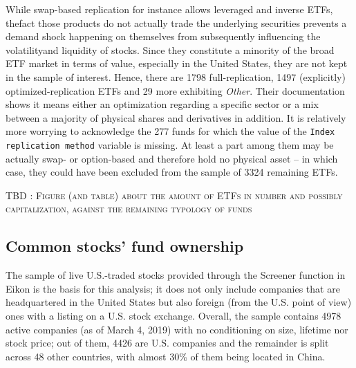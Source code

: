 While swap-based replication for instance allows leveraged and inverse ETFs, thefact those products do not actually trade the underlying securities prevents a demand shock happening on themselves from subsequently influencing the volatilityand liquidity of stocks. Since they constitute a minority of the broad ETF market in terms of value, especially in the United States, they are not kept in the sample of interest. Hence, there are 1798 full-replication, 1497 (explicitly) optimized-replication ETFs and 29 more exhibiting \textit{Other}. Their documentation shows it means either an optimization regarding a specific sector or a mix between a majority of physical shares and derivatives in addition. It is relatively more worrying to acknowledge the 277 funds for which the value of the \texttt{Index replication method} variable is missing. At least a part among them may be actually swap- or option-based and therefore hold no physical asset -- in which case, they could have been excluded from the sample of 3324 remaining ETFs.


\begin{center}
  \textsc{TBD : Figure (and table) about the amount of ETFs in number and possibly capitalization, against the remaining typology of funds}
  \end{center}
\subsection{Common stocks' fund ownership}
The sample of live U.S.-traded stocks provided through the Screener function in Eikon is the basis for this analysis; it does not only include companies that are headquartered in the United States but also foreign (from the U.S. point of view) ones with a listing on a U.S. stock exchange. Overall, the sample contains 4978 active companies (as of March 4, 2019) with no conditioning on size, lifetime nor stock price; out of them, 4426 are U.S. companies and the remainder is split across 48 other countries, with almost 30\% of them being located in China.

